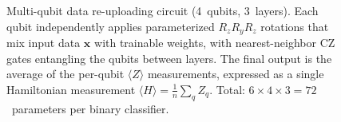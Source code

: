 \begin{figure}[ht]
\caption{Multi-qubit data re-uploading circuit (4~qubits, 3~layers). Each qubit independently applies parameterized $R_z R_y R_z$ rotations that mix input data $\mathbf{x}$ with trainable weights, with nearest-neighbor CZ gates entangling the qubits between layers. The final output is the average of the per-qubit $\langle Z \rangle$ measurements, expressed as a single Hamiltonian measurement $\langle H \rangle = \tfrac{1}{n}\sum_q Z_q$. Total: $6 \times 4 \times 3 = 72$~parameters per binary classifier.}
\label{fig:reup_multi_circuit}
\end{figure}
